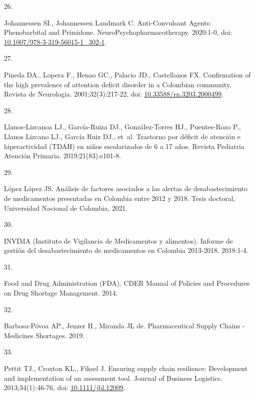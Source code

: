 \documentclass[
]{book}
\newlength{\cslhangindent}
\newlength{\csllabelwidth}
\newlength{\cslentryspacingunit} %
\newenvironment{CSLReferences}[2] %
 {%
  \setlength{\parindent}{0pt}
  \ifodd #1
  \let\oldpar\par
  \def\par{\hangindent=\cslhangindent\oldpar}
  \fi
  \setlength{\parskip}{#2\cslentryspacingunit}
 }%
 {}
\newcommand{\CSLLeftMargin}[1]{\parbox[t]{\csllabelwidth}{#1}}
\newcommand{\CSLRightInline}[1]{\parbox[t]{\linewidth - \csllabelwidth}{#1}\break}
\begin{document}
\begin{CSLReferences}{0}{0}
\leavevmode{}%
\CSLLeftMargin{26. }
\CSLRightInline{Johannessen SI., Johannessen Landmark C. {Anti-Convulsant Agents: Phenobarbital and Primidone}. NeuroPsychopharmacotherapy. 2020:1-0, doi: \href{https://doi.org/10.1007/978-3-319-56015-1_302-1}{10.1007/978-3-319-56015-1\_302-1}.}

\leavevmode{}%
\CSLLeftMargin{27. }
\CSLRightInline{Pineda DA., Lopera F., Henao GC., Palacio JD., Castellanos FX. {Confirmation of the high prevalence of attention deficit disorder in a Colombian community}. Revista de Neurologia. 2001;32(3):217-22, doi: \href{https://doi.org/10.33588/rn.3203.2000499}{10.33588/rn.3203.2000499}.}

\leavevmode{}%
\CSLLeftMargin{28. }
\CSLRightInline{Llanos-Lizcanoa LJ., García-Ruiza DJ., González-Torres HJ., Puentes-Rozo P., Llanos Lizcano LJ., García Ruiz DJ., et~al. {Trastorno por d{é}ficit de atenci{ó}n e hiperactividad (TDAH) en ni{ñ}os escolarizados de 6 a 17 a{ñ}os}. Revista Pediatria Atenci{ó}n Primaria. 2019;21(83):e101-8.}

\leavevmode{}%
\CSLLeftMargin{29. }
\CSLRightInline{López López JS. {An{á}lisis de factores asociados a las alertas de desabastecimiento de medicamentos presentadas en Colombia entre 2012 y 2018}. Tesis doctoral, Universidad Nacional de Colombia, 2021.}

\leavevmode{}%
\CSLLeftMargin{30. }
\CSLRightInline{INVIMA (Instituto de Vigilancia de Medicamentos y alimentos). {Informe de gesti{ó}n del desabastecimiento de medicamentos en Colombia 2013-2018}. 2018:1-4.}

\leavevmode{}%
\CSLLeftMargin{31. }
\CSLRightInline{Food and Drug Administration (FDA). {CDER Manual of Policies and Procedures on Drug Shortage Management}. 2014.}

\leavevmode{}%
\CSLLeftMargin{32. }
\CSLRightInline{Barbosa-Póvoa AP., Jenzer H., Miranda JL de. {Pharmaceutical Supply Chains - Medicines Shortages}. 2019.}

\leavevmode{}%
\CSLLeftMargin{33. }
\CSLRightInline{Pettit TJ., Croxton KL., Fiksel J. {Ensuring supply chain resilience: Development and implementation of an assessment tool}. Journal of Business Logistics. 2013;34(1):46-76, doi: \href{https://doi.org/10.1111/jbl.12009}{10.1111/jbl.12009}.}


\end{CSLReferences}
\end{document}
